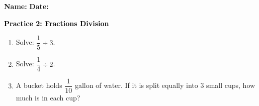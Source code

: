\documentclass[12pt, letterpaper, fleqn]{article}
\begin{document}
\textbf{Name:} \underline{\hspace{5cm}}
\hfill
\textbf{Date:} \underline{\hspace{3cm}}\\

\begin{tcolorbox}[colback=customteal!20]
    \large\textcolor{black}{\textbf{Practice 2: Fractions Division}}
\end{tcolorbox}
\begin{enumerate}[itemsep=3.5cm, leftmargin=0.6cm]
\item Solve: $\dfrac{1}{5} \div 3$.
\vspace{3.5cm}
\item Solve: $\dfrac{1}{4} \div 2$.
\vspace{3.5cm}
\item A bucket holds $\dfrac{1}{10}$ gallon of water. If it is split equally into 3 small cups, how much is in each cup?
\end{enumerate}
\end{document}

